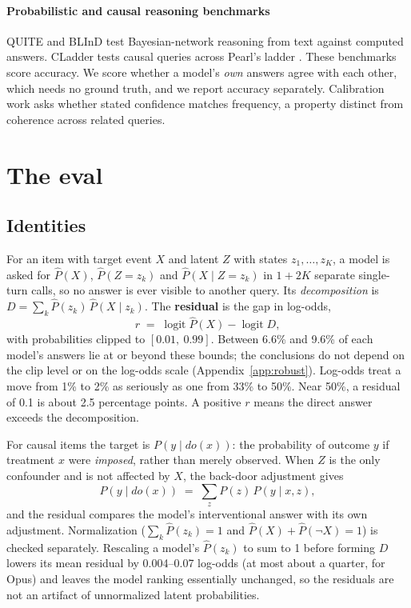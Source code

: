 \documentclass[11pt]{article}
\newcommand{\phat}{\hat{P}}
\newcommand{\logit}{\operatorname{logit}}
\begin{document}
\paragraph{Probabilistic and causal reasoning benchmarks} QUITE \citep{schrader2024quite} and BLInD \citep{nafar2025reasoning} test Bayesian-network reasoning from text against computed answers. CLadder \citep{jin2023cladder} tests causal queries across Pearl's ladder \citep{pearl2009causality}. These benchmarks score accuracy. We score whether a model's \emph{own} answers agree with each other, which needs no ground truth, and we report accuracy separately. Calibration work \citep{kadavath2022language} asks whether stated confidence matches frequency, a property distinct from coherence across related queries.

\section{The eval}

\subsection{Identities}
\label{sec:identities}

For an item with target event $X$ and latent $Z$ with states $z_1,\dots,z_K$, a model is asked for $\phat(X)$, $\phat(Z=z_k)$ and $\phat(X\mid Z=z_k)$ in $1+2K$ separate single-turn calls, so no answer is ever visible to another query. Its \emph{decomposition} is $D=\sum_k \phat(z_k)\,\phat(X\mid z_k)$. The \textbf{residual} is the gap in log-odds,
\begin{equation}
r \;=\; \logit\phat(X) - \logit D,
\label{eq:resid}
\end{equation}
with probabilities clipped to $[0.01,\ 0.99]$. Between 6.6\% and 9.6\% of each model's answers lie at or beyond these bounds; the conclusions do not depend on the clip level or on the log-odds scale (Appendix~\ref{app:robust}). Log-odds treat a move from 1\% to 2\% as seriously as one from 33\% to 50\%. Near 50\%, a residual of 0.1 is about 2.5 percentage points. A positive $r$ means the direct answer exceeds the decomposition.

For causal items the target is $P(y\mid do(x))$: the probability of outcome $y$ if treatment $x$ were \emph{imposed}, rather than merely observed. When $Z$ is the only confounder and is not affected by $X$, the back-door adjustment gives
\begin{equation}
P(y\mid do(x)) \;=\; \sum_z P(z)\,P(y\mid x, z),
\label{eq:backdoor}
\end{equation}
and the residual compares the model's interventional answer with its own adjustment. Normalization ($\sum_k\phat(z_k)=1$ and $\phat(X)+\phat(\lnot X)=1$) is checked separately. Rescaling a model's $\phat(z_k)$ to sum to 1 before forming $D$ lowers its mean residual by 0.004--0.07 log-odds (at most about a quarter, for Opus) and leaves the model ranking essentially unchanged, so the residuals are not an artifact of unnormalized latent probabilities.
\end{document}
